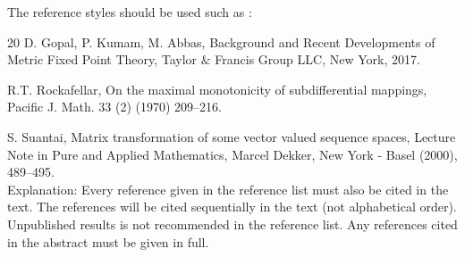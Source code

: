 \documentclass[fleqn,reqno,10pt, dvipdfmx]{thaijmath}
\begin{document}
\vskip0.5cm
The reference styles should be used such as \cite{DG, RTR, SS}: 


\begin{thebibliography}{20}
 D. Gopal, P. Kumam, M. Abbas, Background and Recent Developments of Metric Fixed Point Theory, Taylor $\&$ Francis Group LLC, New York, 2017. 

\vskip0.1cm

 R.T. Rockafellar, On the maximal monotonicity of subdifferential mappings, Pacific J. Math. 33 (2) (1970) 209--216.

\vskip0.1cm


 S. Suantai, Matrix transformation of some vector valued sequence spaces, Lecture Note in Pure and Applied Mathematics, Marcel Dekker, New York - Basel (2000), 489--495. \\
	

\noindent Explanation: Every reference given in the reference list must also be cited in the text. The references will be cited sequentially in the text (not alphabetical order). Unpublished results is not recommended in the reference list. Any references cited in the abstract must be given in full. 
\end{thebibliography}
\end{document}
